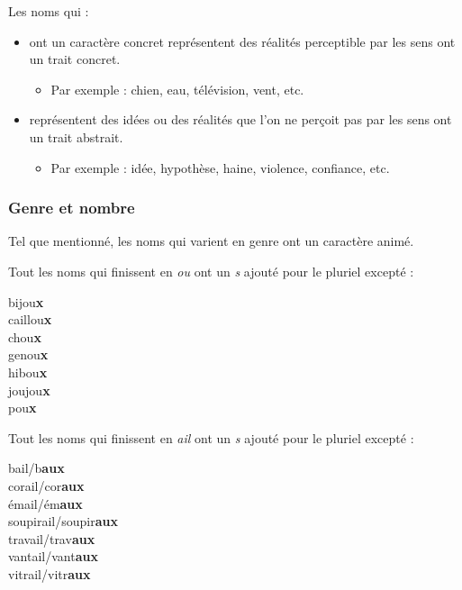 \documentclass[10pt, french]{article}
\begin{document}
\begin{multicols*}{2}
\begin{definitionNOHFILLpropos}
Les noms qui :
\begin{itemize}
	\item	ont un caractère concret représentent des réalités perceptible par les sens ont un trait  concret.
		\begin{itemize}
		\item	Par exemple : chien, eau, télévision, vent, etc.
		\end{itemize}
	\item	représentent des idées ou des réalités que l'on ne perçoit pas par les sens ont un trait abstrait.
		\begin{itemize}
		\item	Par exemple : idée, hypothèse, haine, violence, confiance, etc.
		\end{itemize}
\end{itemize}
\end{definitionNOHFILLpropos}


\subsubsection*{Genre et nombre}
Tel que mentionné, les noms qui varient en genre ont un caractère animé.
\begin{astuces}
Tout les noms qui finissent en \textit{ou} ont un \textit{s} ajouté pour le pluriel excepté :
\begin{multicols*}{2}
\begin{description}
	\item[bijou\textbf{x}]
	\item[caillou\textbf{x}]
	\item[chou\textbf{x}]
	\item[genou\textbf{x}]
	\item[hibou\textbf{x}]
	\item[joujou\textbf{x}]
	\item[pou\textbf{x}]
\end{description}
\end{multicols*}
\end{astuces}

\begin{astuces}
Tout les noms qui finissent en \textit{ail} ont un \textit{s} ajouté pour le pluriel excepté :
\begin{multicols*}{2}
\begin{description}
	\item[bail/b\textbf{aux}]
	\item[corail/cor\textbf{aux}]
	\item[émail/ém\textbf{aux}]
	\item[soupirail/soupir\textbf{aux}]
	\item[travail/trav\textbf{aux}]
	\item[vantail/vant\textbf{aux}]
	\item[vitrail/vitr\textbf{aux}]
\end{description}
\end{multicols*}
\end{astuces}


\end{multicols*}
\end{document}
